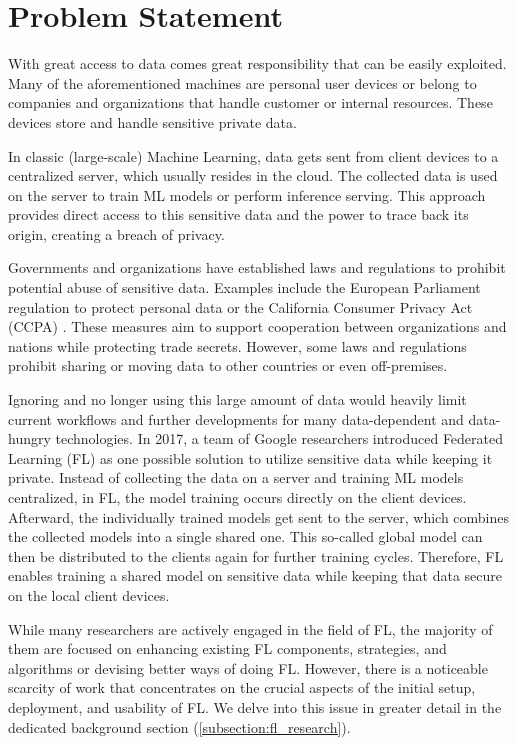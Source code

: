 \section{Problem Statement}

With great access to data comes great responsibility that can be easily exploited.
Many of the aforementioned machines are personal user devices or belong to
companies and organizations that handle customer or internal resources.
These devices store and handle sensitive private data.

In classic (large-scale) Machine Learning, data gets sent from client devices to a centralized server, which usually resides in the cloud.
The collected data is used on the server to train ML models or perform inference serving.
This approach provides direct access to this sensitive data and the power to trace back its origin,
creating a breach of privacy. \cite{book:fl}

Governments and organizations have established laws and regulations to prohibit
potential abuse of sensitive data.
Examples include the European Parliament regulation to protect personal data \cite{eu_regulation}
or the California Consumer Privacy Act (CCPA) \cite{california_consumer_privacy_act}.
These measures aim to support cooperation between organizations and nations while protecting trade secrets.
However, some laws and regulations prohibit sharing or moving data to other countries or even off-premises. \cite{book:fl}

Ignoring and no longer using this large amount of data would heavily limit current workflows
and further developments for many data-dependent and data-hungry technologies.
In 2017, a team of Google researchers introduced Federated Learning (FL)
as one possible solution to utilize sensitive data while keeping it private.
Instead of collecting the data on a server and training ML models centralized,
in FL, the model training occurs directly on the client devices.
Afterward, the individually trained models get sent to the server,
which combines the collected models into a single shared one.
This so-called global model can then be distributed to the clients again for further training cycles.
Therefore, FL enables training a shared model on sensitive data
while keeping that data secure on the local client devices. \cite{paper:original_fl}

While many researchers are actively engaged in the field of FL,
the majority of them are focused on enhancing existing FL components,
strategies, and algorithms or devising better ways of doing FL.
However, there is a noticeable scarcity of work that concentrates
on the crucial aspects of the initial setup, deployment, and usability of FL.
We delve into this issue in greater detail
in the dedicated background section (\ref{subsection:fl_research}).

